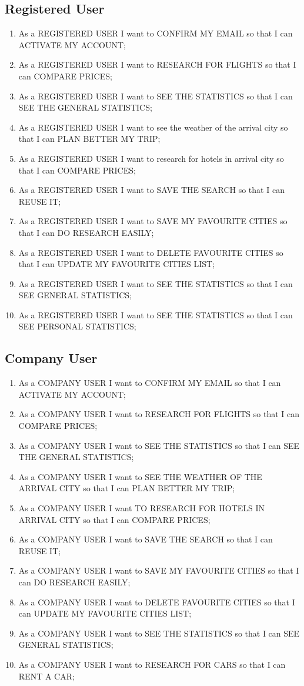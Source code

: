 \documentclass[11pt]{article}
\begin{document}
\subsection{Registered User}
\begin{enumerate}
	\item As a REGISTERED USER I want to CONFIRM MY EMAIL so that I can ACTIVATE MY ACCOUNT;
	\item As a REGISTERED USER I want to RESEARCH FOR FLIGHTS so that I can COMPARE PRICES;
	\item As a REGISTERED USER I want to SEE THE STATISTICS so that I can SEE THE GENERAL STATISTICS;
	\item As a REGISTERED USER I want to see the weather of the arrival city so that I can PLAN BETTER MY TRIP;
	\item As a REGISTERED USER I want to research for hotels in arrival city so that I can COMPARE PRICES;
	\item As a REGISTERED USER I want to SAVE THE SEARCH so that I can REUSE IT;
	\item As a REGISTERED USER I want to SAVE MY FAVOURITE CITIES so that I can DO RESEARCH EASILY;
	\item As a REGISTERED USER I want to DELETE FAVOURITE CITIES so that I can UPDATE MY FAVOURITE CITIES LIST;
	\item As a REGISTERED USER I want to SEE THE STATISTICS so that I can SEE GENERAL STATISTICS;
	\item As a REGISTERED USER I want to SEE THE STATISTICS so that I can SEE PERSONAL STATISTICS;
\end{enumerate}

\subsection{Company User}
\begin{enumerate}
	\item As a COMPANY USER I want to CONFIRM MY EMAIL so that I can ACTIVATE MY ACCOUNT;
	\item As a COMPANY USER I want to RESEARCH FOR FLIGHTS so that I can COMPARE PRICES;
	\item As a COMPANY USER I want to SEE THE STATISTICS so that I can SEE THE GENERAL STATISTICS;
	\item As a COMPANY USER I want to SEE THE WEATHER OF THE ARRIVAL CITY so that I can PLAN BETTER MY TRIP;
	\item As a COMPANY USER I want TO RESEARCH FOR HOTELS IN ARRIVAL CITY so that I can COMPARE PRICES;
	\item As a COMPANY USER I want to SAVE THE SEARCH so that I can REUSE IT;
	\item As a COMPANY USER I want to SAVE MY FAVOURITE CITIES so that I can DO RESEARCH EASILY;
	\item As a COMPANY USER I want to DELETE FAVOURITE CITIES so that I can UPDATE MY FAVOURITE CITIES LIST;
	\item As a COMPANY USER I want to SEE THE STATISTICS so that I can SEE GENERAL STATISTICS;
	\item As a COMPANY USER I want to RESEARCH FOR CARS so that I can RENT A CAR;
\end{enumerate}
\end{document}
